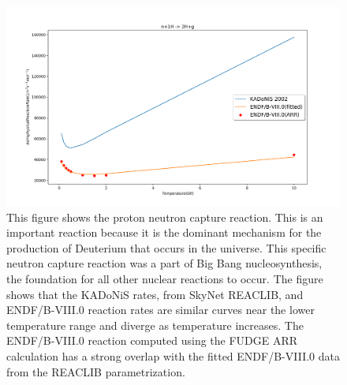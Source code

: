 \documentclass{article}
\begin{document}
\begin{figure}
\includegraphics[width=\linewidth]{Hpng.png}
\caption{This figure shows the proton neutron capture reaction. This is an important reaction because it is the dominant mechanism for the production of Deuterium that occurs in the universe. This specific neutron capture reaction was a part of Big Bang nucleosynthesis, the foundation for all other nuclear reactions to occur. The figure shows that the KADoNiS rates, from SkyNet REACLIB, and ENDF/B-VIII.0 reaction rates are similar curves near the lower temperature range and diverge as temperature increases. The ENDF/B-VIII.0 reaction computed using the FUDGE ARR calculation has a strong overlap with the fitted ENDF/B-VIII.0 data from the REACLIB parametrization.
}
\end{figure}
\end{document}
